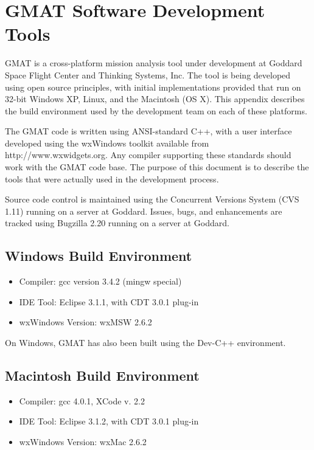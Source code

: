 \chapter{GMAT Software Development Tools}

GMAT is a cross-platform mission analysis tool under development at Goddard Space Flight Center and
Thinking Systems, Inc.  The tool is being developed using open source principles, with initial
implementations provided that run on 32-bit Windows XP, Linux, and the Macintosh (OS X).  This
appendix describes the build environment used by the development team on each of these platforms.

The GMAT code is written using ANSI-standard C++, with a user interface developed using the
wxWindows toolkit available from http://www.wxwidgets.org.  Any compiler supporting these standards
should work with the GMAT code base.  The purpose of this document is to describe the tools that
were actually used in the development process.

Source code control is maintained using the Concurrent Versions System (CVS 1.11) running on a
server at Goddard.  Issues, bugs, and enhancements are tracked using Bugzilla 2.20 running on a
server at Goddard.

\section{Windows Build Environment}
\begin{itemize}
   \item Compiler: gcc version 3.4.2 (mingw special)
   \item IDE Tool: Eclipse 3.1.1, with CDT 3.0.1 plug-in
   \item wxWindows Version: wxMSW 2.6.2
\end{itemize}

On Windows, GMAT has also been built using the Dev-C++ environment.

\section{Macintosh Build Environment}
\begin{itemize}
   \item Compiler: gcc 4.0.1, XCode v. 2.2
   \item IDE Tool: Eclipse 3.1.2, with CDT 3.0.1 plug-in
   \item wxWindows Version: wxMac 2.6.2
\end{itemize}

